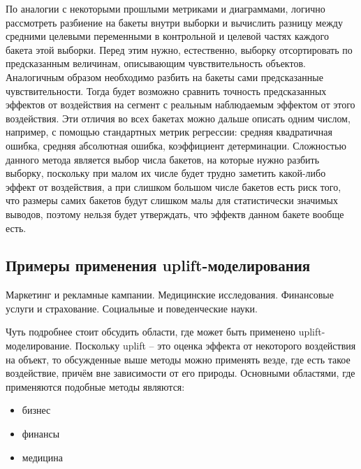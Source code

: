 По аналогии с некоторыми прошлыми метриками и диаграммами, логично рассмотреть разбиение на бакеты внутри выборки и вычислить разницу между средними целевыми переменными в контрольной и целевой частях каждого бакета этой выборки. Перед этим нужно, естественно, выборку отсортировать по предсказанным величинам, описывающим чувствительность объектов. Аналогичным образом необходимо разбить на бакеты сами предсказанные чувствительности. Тогда будет возможно сравнить точность предсказанных эффектов от воздействия на сегмент с реальным наблюдаемым эффектом от этого воздействия. Эти отличия во всех бакетах можно дальше описать одним числом, например, с помощью стандартных метрик регрессии: средняя квадратичная ошибка, средняя абсолютная ошибка, коэффициент детерминации. Сложностью данного метода является выбор числа бакетов, на которые нужно разбить выборку, поскольку при малом их числе будет трудно заметить какой-либо эффект от воздействия, а при слишком большом числе бакетов есть риск того, что размеры самих бакетов будут слишком малы для статистически значимых выводов, поэтому нельзя будет утверждать, что эффектв данном бакете вообще есть. 




















\subsection{Примеры применения uplift-моделирования}

    Маркетинг и рекламные кампании.
    Медицинские исследования.
    Финансовые услуги и страхование.
    Социальные и поведенческие науки.

Чуть подробнее стоит обсудить области, где может быть применено uplift-моделирование. Поскольку uplift -- это оценка эффекта от некоторого воздействия на объект, то обсужденные выше методы можно применять везде, где есть такое воздействие, причём вне зависимости от его природы. Основными областями, где применяются подобные методы являются:
\begin{itemize}
    \item бизнес
    \item финансы
    \item медицина
\end{itemize}

